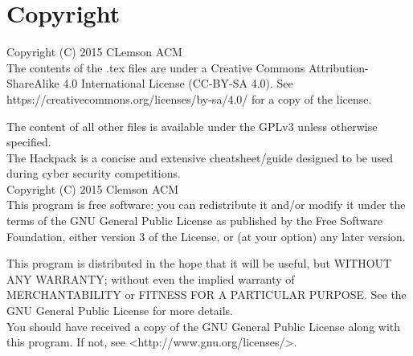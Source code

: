 \section*{Copyright}
Copyright (C) 2015 CLemson ACM \\
The contents of the .tex files are under a Creative Commons Attribution-ShareAlike 4.0
International License (CC-BY-SA 4.0). 
See https://creativecommons.org/licenses/by-sa/4.0/ for a copy of the license.

The content of all other files is available under the GPLv3 unless otherwise specified. \\
The Hackpack is a concise and extensive cheatsheet/guide designed to be used during cyber security competitions. \\
Copyright (C) 2015  Clemson ACM \\

This program is free software: you can redistribute it and/or modify
it under the terms of the GNU General Public License as published by
the Free Software Foundation, either version 3 of the License, or
(at your option) any later version.

This program is distributed in the hope that it will be useful,
but WITHOUT ANY WARRANTY; without even the implied warranty of
MERCHANTABILITY or FITNESS FOR A PARTICULAR PURPOSE\@.  See the
GNU General Public License for more details. \\

You should have received a copy of the GNU General Public License
along with this program.  If not, see <http://www.gnu.org/licenses/>.

\break

